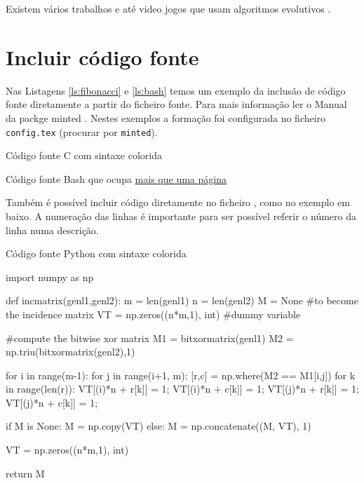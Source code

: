 Existem vários trabalhos e até video jogos que usam algoritmos evolutivos \parencite{Sims1992,url_Spore}.

\section{Incluir código fonte}
Nas Listagens \ref{ls:fibonacci} e \ref{ls:bash} temos um exemplo da inclusão de código fonte diretamente a partir do ficheiro fonte. Para mais informação ler o Manual da packge minted \parencite{Rudolph2016}. Nestes exemplos a formação foi configurada no ficheiro \texttt{config.tex} (procurar por \texttt{minted}). 


\begin{listing}[H] %
    \caption{Código fonte C com sintaxe colorida}
    \label{ls:fibonacci}
\end{listing}


\begin{longlisting} %
    \caption{Código fonte Bash que ocupa \underline{mais que uma página}}
    \label{ls:bash}
\end{longlisting}



Também é possível incluir código diretamente no ficheiro \LaTeXe, como no exemplo em baixo. A numeração das linhas é importante para ser possível referir o número da linha numa descrição.



\begin{listing}[H]
    \caption{Código fonte Python com sintaxe colorida}
    \label{ls:bash}
    \begin{pythoncode}
import numpy as np

def incmatrix(genl1,genl2):
    m = len(genl1)
    n = len(genl2)
    M = None #to become the incidence matrix
    VT = np.zeros((n*m,1), int)  #dummy variable

    #compute the bitwise xor matrix
    M1 = bitxormatrix(genl1)
    M2 = np.triu(bitxormatrix(genl2),1) 

    for i in range(m-1):
        for j in range(i+1, m):
            [r,c] = np.where(M2 == M1[i,j])
            for k in range(len(r)):
                VT[(i)*n + r[k]] = 1;
                VT[(i)*n + c[k]] = 1;
                VT[(j)*n + r[k]] = 1;
                VT[(j)*n + c[k]] = 1;

                if M is None:
                    M = np.copy(VT)
                else:
                    M = np.concatenate((M, VT), 1)

                VT = np.zeros((n*m,1), int)

return M
    \end{pythoncode}
\end{listing}
